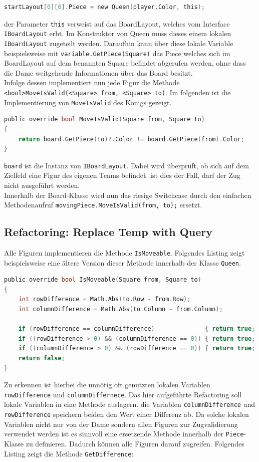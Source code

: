 \documentclass[
10pt, %
a4paper, %
oneside, %
headinclude,footinclude, %
BCOR5mm, %
]{scrartcl}
\begin{document}
\begin{lstlisting}[language=c, style=mStyle]
startLayout[0][0].Piece = new Queen(player.Color, this);
\end{lstlisting}

der Parameter \texttt{this} verweist auf das BoardLayout, welches vom Interface \texttt{IBoardLayout} erbt. Im Konstruktor von Queen muss dieses einem lokalen \texttt{IBoardLayout} zugeteilt werden. Daraufhin kann über diese lokale Variable beispielsweise mit \texttt{variable.GetPiece(Square)} das Piece welches sich im BoardLayout auf dem benannten Square befindet abgerufen werden, ohne dass die Dame weitgehende Informationen über das Board besitzt.\\
Infolge dessen implementiert nun jede Figur die Methode \texttt{<bool>MoveIsValid(<Square> from, <Square> to)}. Im folgenden ist die Implementierung von \texttt{MoveIsValid} des Königs gezeigt.

\begin{lstlisting}[language=c, style=mStyle]
public override bool MoveIsValid(Square from, Square to)
{
	return board.GetPiece(to)?.Color != board.GetPiece(from).Color;
}
\end{lstlisting}

\texttt{board} ist die Instanz von \texttt{IBoardLayout}. Dabei wird überprüft, ob sich auf dem Zielfeld eine Figur des eigenen Teams befindet. ist dies der Fall, darf der Zug nicht ausgeführt werden.\\
Innerhalb der Board-Klasse wird nun das riesige Switchcase durch den einfachen Methodenaufruf \texttt{movingPiece.MoveIsValid(from, to);} ersetzt.

\subsection{Refactoring: Replace Temp with Query}
Alle Figuren implementieren die Methode \texttt{IsMoveable}. Folgendes Listing zeigt beispielsweise eine ältere Version dieser Methode innerhalb der Klasse \texttt{Queen}.


\begin{lstlisting}[language=c, style=mStyle]
public override bool IsMoveable(Square from, Square to)
{
	int rowDifference = Math.Abs(to.Row - from.Row);
	int columnDifference = Math.Abs(to.Column - from.Column);

	if (rowDifference == columnDifference)              { return true; }
	if ((rowDifference > 0) && (columnDifference == 0)) { return true; }
	if ((columnDifference > 0) && (rowDifference == 0)) { return true; }
	return false;
}
\end{lstlisting}
Zu erkennen ist hierbei die unnötig oft genutzten lokalen Variablen \texttt{rowDifference} und \texttt{columnDiffernece}. Das hier aufgeführte Refactoring soll lokale Variablen in eine Methode auslagern. die Variablen \texttt{columnDifference} und \texttt{rowDifference} speichern beiden den Wert einer Differenz ab. Da solche lokalen Variablen nicht nur von der Dame sondern allen Figuren zur Zugvalidierung verwendet werden ist es sinnvoll eine ersetzende Methode innerhalb der \texttt{Piece}-Klasse zu definieren. Dadurch können alle Figuren darauf zugreifen. Folgendes Listing zeigt die Methode \texttt{GetDifference}:
\end{document}
